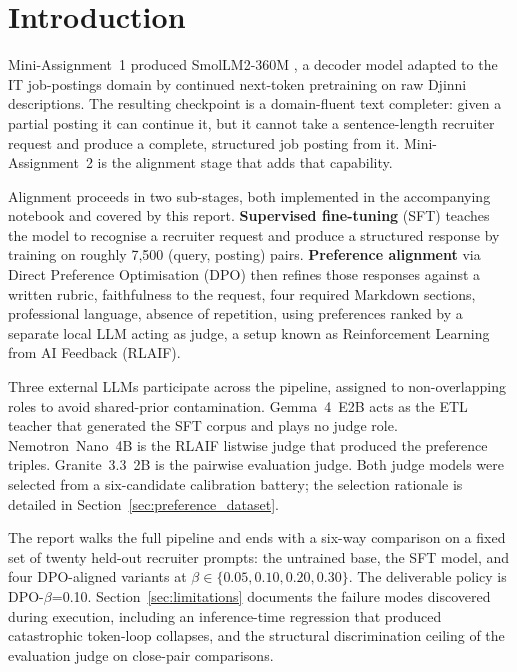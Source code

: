 \documentclass[../main.tex]{subfiles}
\begin{document}
\section{Introduction}
\label{sec:introduction}

Mini-Assignment~1 produced SmolLM2-360M \cite{smollm2}, a decoder model adapted to the IT job-postings domain by continued next-token pretraining on raw Djinni descriptions. The resulting checkpoint is a domain-fluent text completer: given a partial posting it can continue it, but it cannot take a sentence-length recruiter request and produce a complete, structured job posting from it. Mini-Assignment~2 is the alignment stage that adds that capability.

Alignment proceeds in two sub-stages, both implemented in the accompanying notebook and covered by this report. \textbf{Supervised fine-tuning} (SFT) teaches the model to recognise a recruiter request and produce a structured response by training on roughly 7{,}500 (query, posting) pairs. \textbf{Preference alignment} via Direct Preference Optimisation \cite{rafailov2023dpo} (DPO) then refines those responses against a written rubric, faithfulness to the request, four required Markdown sections, professional language, absence of repetition, using preferences ranked by a separate local LLM acting as judge, a setup known as Reinforcement Learning from AI Feedback \cite{bai2022constitutional} (RLAIF).

Three external LLMs participate across the pipeline, assigned to non-overlapping roles to avoid shared-prior contamination. Gemma~4~E2B acts as the ETL teacher that generated the SFT corpus and plays no judge role. Nemotron~Nano~4B is the RLAIF listwise judge that produced the preference triples. Granite~3.3~2B is the pairwise evaluation judge. Both judge models were selected from a six-candidate calibration battery; the selection rationale is detailed in Section~\ref{sec:preference_dataset}.

The report walks the full pipeline and ends with a six-way comparison on a fixed set of twenty held-out recruiter prompts: the untrained base, the SFT model, and four DPO-aligned variants at $\beta \in \{0.05, 0.10, 0.20, 0.30\}$. The deliverable policy is DPO-$\beta$=0.10. Section~\ref{sec:limitations} documents the failure modes discovered during execution, including an inference-time regression that produced catastrophic token-loop collapses, and the structural discrimination ceiling of the evaluation judge on close-pair comparisons.
\end{document}

